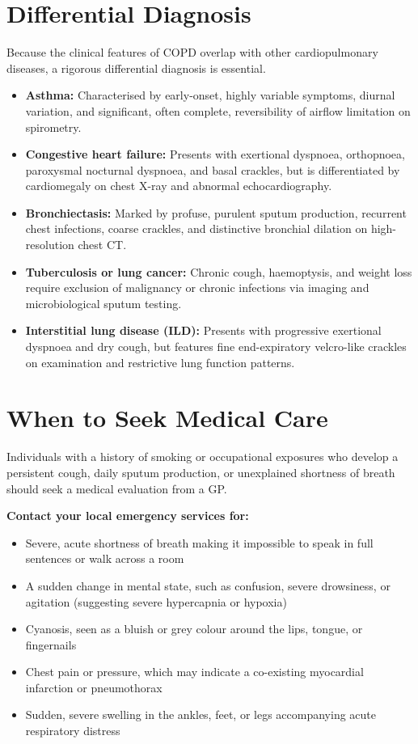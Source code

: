 \section*{Differential Diagnosis}
Because the clinical features of COPD overlap with other cardiopulmonary diseases, a rigorous differential diagnosis is essential.
\begin{itemize}
    \item \textbf{Asthma:} Characterised by early-onset, highly variable symptoms, diurnal variation, and significant, often complete, reversibility of airflow limitation on spirometry.
    \item \textbf{Congestive heart failure:} Presents with exertional dyspnoea, orthopnoea, paroxysmal nocturnal dyspnoea, and basal crackles, but is differentiated by cardiomegaly on chest X-ray and abnormal echocardiography.
    \item \textbf{Bronchiectasis:} Marked by profuse, purulent sputum production, recurrent chest infections, coarse crackles, and distinctive bronchial dilation on high-resolution chest CT.
    \item \textbf{Tuberculosis or lung cancer:} Chronic cough, haemoptysis, and weight loss require exclusion of malignancy or chronic infections via imaging and microbiological sputum testing.
    \item \textbf{Interstitial lung disease (ILD):} Presents with progressive exertional dyspnoea and dry cough, but features fine end-expiratory velcro-like crackles on examination and restrictive lung function patterns.
\end{itemize}

\section*{When to Seek Medical Care}
Individuals with a history of smoking or occupational exposures who develop a persistent cough, daily sputum production, or unexplained shortness of breath should seek a medical evaluation from a GP.

\textbf{Contact your local emergency services for:}
\begin{itemize}
    \item Severe, acute shortness of breath making it impossible to speak in full sentences or walk across a room
    \item A sudden change in mental state, such as confusion, severe drowsiness, or agitation (suggesting severe hypercapnia or hypoxia)
    \item Cyanosis, seen as a bluish or grey colour around the lips, tongue, or fingernails
    \item Chest pain or pressure, which may indicate a co-existing myocardial infarction or pneumothorax
    \item Sudden, severe swelling in the ankles, feet, or legs accompanying acute respiratory distress
\end{itemize}

